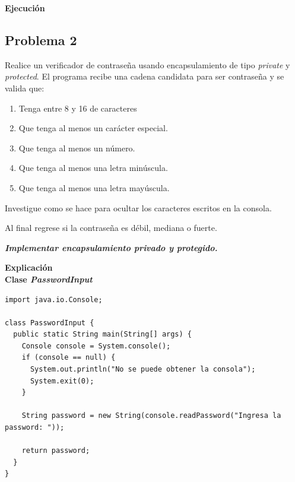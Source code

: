 \documentclass[11pt, twocolumn]{article}
\newcommand{\linejump}{\hfill \break}
\begin{document}

  \textbf{Ejecución}

  \subsection*{Problema 2}
  Realice un verificador de contraseña usando encapsulamiento de tipo \textit{private} y \textit{protected}. El programa recibe una cadena candidata para ser contraseña y se valida que:
  \begin{enumerate}[label=\alph*.]
    \item Tenga entre 8 y 16 de caracteres
    \item Que tenga al menos un carácter especial.
    \item Que tenga al menos un número.
    \item Que tenga al menos una letra minúscula.
    \item Que tenga al menos una letra mayúscula.
  \end{enumerate}
  Investigue como se hace para ocultar los caracteres escritos en la consola.

  Al final regrese si la contraseña es débil, mediana o fuerte.

  \textbf{\textit{Implementar encapsulamiento privado y protegido.}}

  \linejump
  \textbf{Explicación} \\


  \textbf{Clase \textit{PasswordInput}}
  \begin{lstlisting}
import java.io.Console;

class PasswordInput {
  public static String main(String[] args) {
    Console console = System.console();
    if (console == null) {
      System.out.println("No se puede obtener la consola");
      System.exit(0);
    }

    String password = new String(console.readPassword("Ingresa la password: "));

    return password;
  }
}
  \end{lstlisting}
\end{document}
